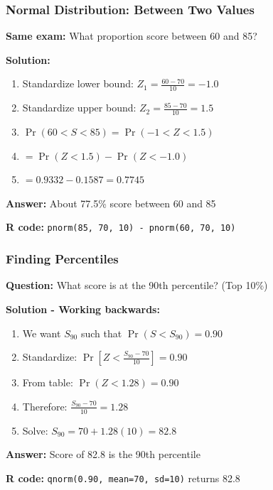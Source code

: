 \documentclass{beamer}
\begin{document}
\begin{frame}
\frametitle{Normal Distribution: Between Two Values}
\textbf{Same exam:} What proportion score between 60 and 85?

\vspace{0.3cm}
\textbf{Solution:}
\begin{enumerate}
\item Standardize lower bound: $Z_1 = \frac{60-70}{10} = -1.0$
\item Standardize upper bound: $Z_2 = \frac{85-70}{10} = 1.5$
\item $\Pr(60 < S < 85) = \Pr(-1 < Z < 1.5)$
\item $= \Pr(Z < 1.5) - \Pr(Z < -1.0)$
\item $= 0.9332 - 0.1587 = 0.7745$
\end{enumerate}

\vspace{0.3cm}
\textbf{Answer:} About 77.5\% score between 60 and 85

\vspace{0.3cm}
\textbf{R code:} \texttt{pnorm(85, 70, 10) - pnorm(60, 70, 10)}
\end{frame}

\begin{frame}
\frametitle{Finding Percentiles}
\textbf{Question:} What score is at the 90th percentile? (Top 10\%)

\vspace{0.2cm}
\textbf{Solution - Working backwards:}
\begin{enumerate}
\item We want $S_{90}$ such that $\Pr(S < S_{90}) = 0.90$
\item Standardize: $\Pr\left[Z < \frac{S_{90} - 70}{10}\right] = 0.90$
\item From table: $\Pr(Z < 1.28) = 0.90$
\item Therefore: $\frac{S_{90} - 70}{10} = 1.28$
\item Solve: $S_{90} = 70 + 1.28(10) = 82.8$
\end{enumerate}

\vspace{0.2cm}
\textbf{Answer:} Score of 82.8 is the 90th percentile

\vspace{0.2cm}
\textbf{R code:} \texttt{qnorm(0.90, mean=70, sd=10)} returns 82.8
\end{frame}
\end{document}

